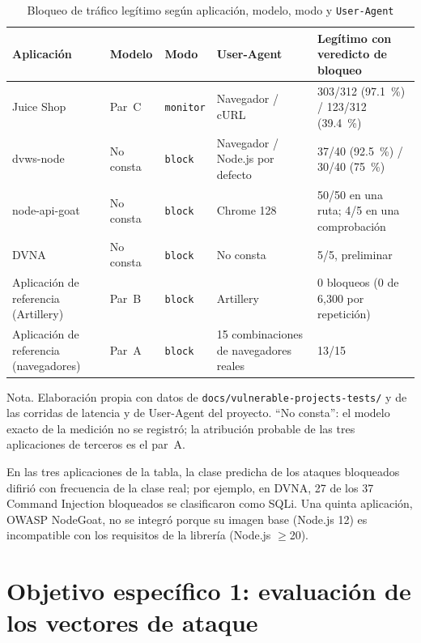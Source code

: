 \begin{table}[H]
\centering
\small
\begin{tabular}{|L{2.6cm}|L{2.2cm}|L{1.8cm}|L{3.0cm}|L{3.0cm}|}
\hline
\textbf{Aplicación} & \textbf{Modelo} & \textbf{Modo} & \textbf{User-Agent} & \textbf{Legítimo con veredicto de bloqueo} \\ \hline
Juice Shop & Par~C & \texttt{monitor} & Navegador / cURL & 303/312 (97.1~\%) / 123/312 (39.4~\%) \\ \hline
dvws-node & No consta & \texttt{block} & Navegador / Node.js por defecto & 37/40 (92.5~\%) / 30/40 (75~\%) \\ \hline
node-api-goat & No consta & \texttt{block} & Chrome 128 & 50/50 en una ruta; 4/5 en una comprobación \\ \hline
DVNA & No consta & \texttt{block} & No consta & 5/5, preliminar \\ \hline
Aplicación de referencia (Artillery) & Par~B & \texttt{block} & Artillery & 0 bloqueos (0 de 6{,}300 por repetición) \\ \hline
Aplicación de referencia (navegadores) & Par~A & \texttt{block} & 15 combinaciones de navegadores reales & 13/15 \\ \hline
\end{tabular}
\caption[Bloqueo de tráfico legítimo por condición]{Bloqueo de tráfico legítimo según aplicación, modelo, modo y \texttt{User-Agent}}
\label{tab:res-terceros-ua}
\end{table}
{\footnotesize Nota. Elaboración propia con datos de \texttt{docs/vulnerable-projects-tests/} y de las corridas de latencia y de User-Agent del proyecto. ``No consta'': el modelo exacto de la medición no se registró; la atribución probable de las tres aplicaciones de terceros es el par~A.}

En las tres aplicaciones de la tabla, la clase predicha de los ataques bloqueados
difirió con frecuencia de la clase real; por ejemplo, en DVNA, 27 de los 37 Command Injection
bloqueados se clasificaron como SQLi. Una quinta aplicación, OWASP NodeGoat, no se integró porque
su imagen base (Node.js 12) es incompatible con los requisitos de la librería (Node.js $\geq$20).

\section{Objetivo específico 1: evaluación de los vectores de ataque}
\label{sec:res-oe1}

